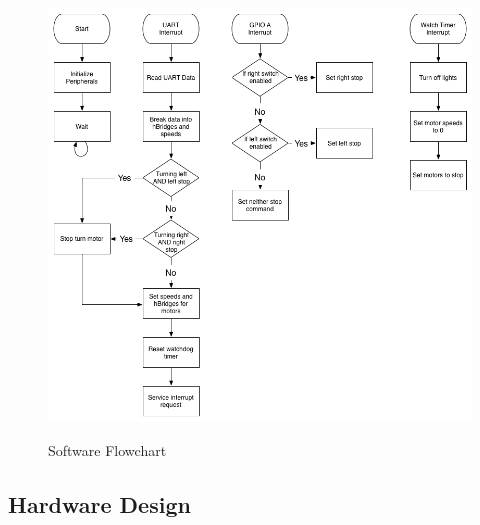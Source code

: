 \documentclass[12pt]{article}
\begin{document}
\begin{figure}[H]
\begin {center}
\includegraphics[scale=0.5]{Software}\\
\caption{Software Flowchart}
\label{fig:software}
\end {center}
\end{figure}

\subsection{Hardware Design}
\end{document}
